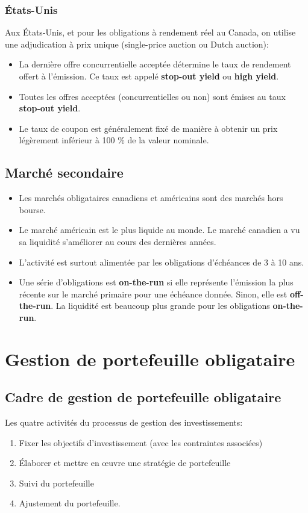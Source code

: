 \documentclass[12pt]{article}
\begin{document}
\subsection{États-Unis}
Aux États-Unis, et pour les obligations à rendement réel au Canada, on utilise une adjudication à prix unique (single-price auction ou Dutch auction):  
\begin{itemize}
\item La dernière offre concurrentielle acceptée détermine le taux de rendement offert à l’émission.  Ce taux est appelé \textbf{stop-out yield} ou \textbf{high yield}.
\item Toutes les offres acceptées (concurrentielles ou non) sont émises au taux \textbf{stop-out yield}.
\item Le taux de coupon est généralement fixé de manière à obtenir un prix légèrement inférieur à 100 \% de la valeur nominale.  
\end{itemize}

\section{Marché secondaire}
\begin{itemize}
\item Les marchés obligataires canadiens et américains sont des marchés hors bourse.  
\item Le marché américain est le plus liquide au monde.  Le marché canadien a vu sa liquidité s’améliorer au cours des dernières années.  
\item L’activité est surtout alimentée par les obligations d’échéances de 3 à 10 ans.  
\item Une série d’obligations est \textbf{on-the-run} si elle représente l’émission la plus récente sur le marché primaire pour une échéance donnée.  Sinon, elle est \textbf{off-the-run}.  La liquidité est beaucoup plus grande pour les obligations \textbf{on-the-run}.  
\end{itemize}

\chapter{Gestion de portefeuille obligataire}
\section{Cadre de gestion de portefeuille obligataire}
Les quatre activités du processus de gestion des investissements:
\begin{enumerate}
\item Fixer les objectifs d'investissement (avec les contraintes associées)
\item Élaborer et mettre en œuvre une stratégie de portefeuille
\item Suivi du portefeuille
\item Ajustement du portefeuille.
\end{enumerate}
\end{document}
